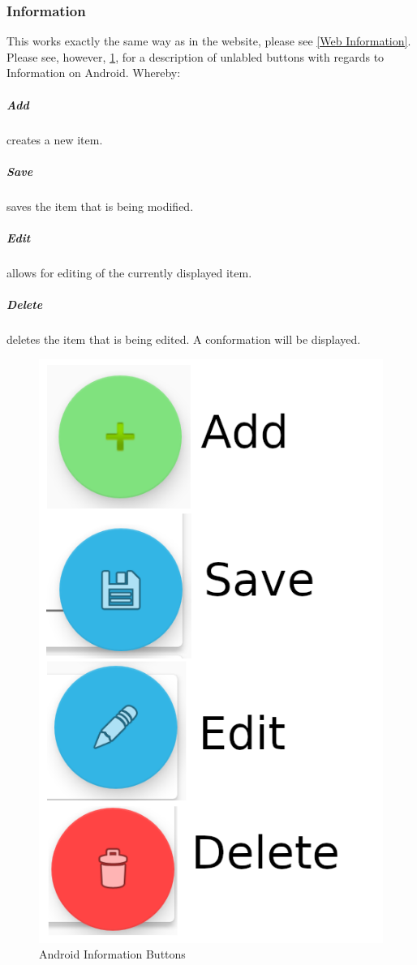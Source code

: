 \documentclass[11pt]{article}
\begin{document}
\subsubsection{Information}
\label{Mobile Information}
This works exactly the same way as in the website, please see \ref{Web Information}.\\
Please see, however, \ref{Android Information Buttons}, for a description of unlabled buttons with regards to Information on Android. Whereby:
\subparagraph{Add} creates a new item.
\subparagraph{Save} saves the item that is being modified.
\subparagraph{Edit} allows for editing of the currently displayed item.
\subparagraph{Delete} deletes the item that is being edited. A conformation will be displayed.

\begin{figure}
 \centering
 \includegraphics[width=12cm, keepaspectratio]{Images/AndroidInformationButtons.png}
 \caption{Android Information Buttons}
 \label{Android Information Buttons}
\end{figure}
\end{document}
